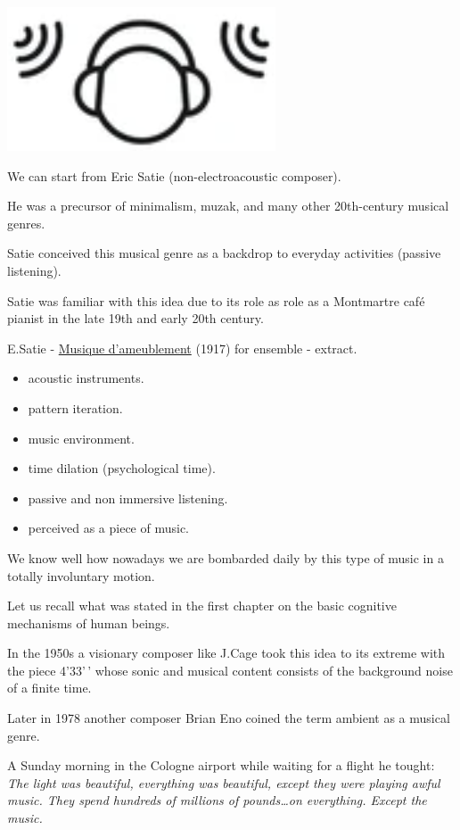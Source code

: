 \begin{center}
\includegraphics[scale=0.4]{../img/ambi.png}
\end{center}

We can start from Eric Satie (non-electroacoustic composer).

He was a precursor of minimalism, muzak, and many other 20th-century musical genres.

Satie conceived this musical genre as a backdrop to everyday activities (passive listening).

Satie was familiar with this idea due to its role as role as a Montmartre café pianist in the late 19th and early 20th century.

E.Satie - \href{http://www.musicaecodice.it/gitmedia/emc/2_media/satie.mp3}{Musique d'ameublement} (1917) for ensemble - extract.

\begin{itemize}
\tightlist
\item acoustic instruments.
\item pattern iteration.
\item music environment.
\item time dilation (psychological time).
\item passive and non immersive listening.
\item perceived as a piece of music.
\end{itemize}

We know well how nowadays we are bombarded daily by this type of music in a totally involuntary motion.

Let us recall what was stated in the first chapter on the basic cognitive mechanisms of human beings.

In the 1950s a visionary composer like J.Cage took this idea to its extreme with the piece 4'33'\,' whose sonic and musical content consists of the background noise of a finite time.

Later in 1978 another composer Brian Eno coined the term ambient as a musical genre.

A Sunday morning in the Cologne airport while waiting for a flight he tought: \textit{The light was beautiful, everything was beautiful, except they were playing awful music. They spend hundreds of millions of pounds\ldots on everything. Except the music.}

